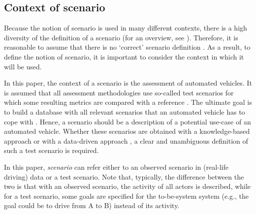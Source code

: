 \subsection{Context of scenario}
\label{sec:context}

Because the notion of scenario is used in many different contexts, there is a high diversity of the definition of a scenario (for an overview, see \cite{vannotten2003updated, bishop2007scentechniques}). Therefore, it is reasonable to assume that there is no `correct' scenario definition \cite{vannotten2003updated}. As a result, to define the notion of scenario, it is important to consider the context in which it will be used.

In this paper, the context of a scenario is the assessment of automated vehicles. It is assumed that all assessment methodologies use so-called test scenarios for which some resulting metrics are compared with a reference \cite{stellet2015taxonomy}. 
The ultimate goal is to build a database with all relevant scenarios that an automated vehicle has to cope with \cite{putz2017pegasus}. Hence, a scenario should be a description of a potential use-case of an automated vehicle. 
Whether these scenarios are obtained with a knowledge-based approach \cite{gietelink2004systemvalidation, stellet2015taxonomy} or with a data-driven approach \cite{deGelder2017assessment, stellet2015taxonomy}, a clear and unambiguous definition of such a test scenario is required. 

In this paper, \emph{scenario} can refer either to an observed scenario in (real-life driving) data or a test scenario. Note that, typically, the difference between the two is that with an observed scenario, the activity of all actors is described, while for a test scenario, some goals are specified for the to-be-system system (e.g., the goal could be to drive from A to B) instead of its activity. 

